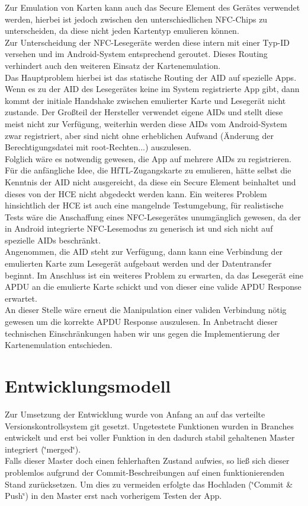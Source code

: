 \documentclass[a4paper,ngerman,12pt]{scrreprt}
\begin{document}
Zur Emulation von Karten kann auch das Secure Element des Gerätes verwendet werden, hierbei ist jedoch zwischen den unterschiedlichen NFC-Chips zu unterscheiden, da diese nicht jeden Kartentyp emulieren können.\\
Zur Unterscheidung der NFC-Lesegeräte werden diese intern mit einer Typ-ID versehen und im Android-System entsprechend geroutet. Dieses Routing verhindert auch den weiteren Einsatz der Kartenemulation.\\ Das Hauptproblem hierbei ist das statische Routing der \ac{AID} auf spezielle Apps. 
Wenn es zu der AID des Lesegerätes keine im System registrierte App gibt, dann kommt der initiale Handshake zwischen emulierter Karte und Lesegerät nicht zustande. 
Der Großteil der Hersteller verwendet eigene AIDs und stellt diese meist nicht zur Verfügung, weiterhin werden diese AIDs vom Android-System zwar registriert, aber sind nicht ohne erheblichen Aufwand (Änderung der Berechtigungsdatei mit root-Rechten...) auszulesen. \\
Folglich wäre es notwendig gewesen, die App auf mehrere AIDs zu registrieren. Für die anfängliche Idee, die HfTL-Zugangskarte zu emulieren, hätte selbst die Kenntnis der AID nicht ausgereicht, da diese ein Secure Element beinhaltet und dieses von der \ac{HCE} nicht abgedeckt werden kann. \newpage
Ein weiteres Problem hinsichtlich der \ac{HCE} ist auch eine mangelnde Testumgebung, für realistische Tests wäre die Anschaffung eines NFC-Lesegerätes unumgänglich gewesen, da der in Android integrierte NFC-Lesemodus zu generisch ist und sich nicht auf spezielle AIDs beschränkt. \\
Angenommen, die AID steht zur Verfügung, dann kann eine Verbindung der emulierten Karte zum Lesegerät aufgebaut werden und der Datentransfer beginnt. 
Im Anschluss ist ein weiteres Problem zu erwarten, da das Lesegerät eine \ac{APDU} an die emulierte Karte schickt und von dieser eine valide APDU Response erwartet. \\
An dieser Stelle wäre erneut die Manipulation einer validen Verbindung nötig gewesen um die korrekte APDU Response auszulesen. In Anbetracht dieser technischen Einschränkungen haben wir uns gegen die Implementierung der Kartenemulation entschieden.

\section{Entwicklungsmodell}

Zur Umsetzung der Entwicklung wurde von Anfang an auf das verteilte Versionskontrollsystem git gesetzt. Ungetestete Funktionen wurden in Branches entwickelt und erst bei voller Funktion in den dadurch stabil gehaltenen Master integriert (\char`\"{}merged\char`\"{}). \\
Falls dieser Master doch einen fehlerhaften Zustand aufwies, so ließ sich dieser problemlos aufgrund der Commit-Beschreibungen auf einen funktionierenden Stand zurücksetzen. Um dies zu vermeiden erfolgte das Hochladen (\char`\"{}Commit \& Push\char`\"{}) in den Master erst nach vorherigem Testen der App. 
\end{document}
